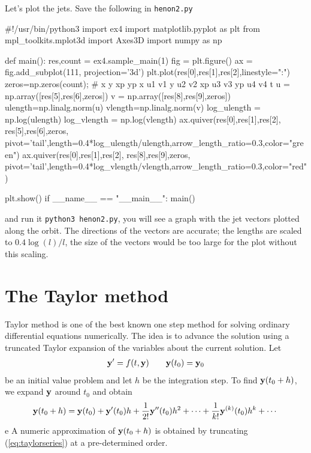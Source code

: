 \documentclass[10pt]{article}
\theoremstyle{remark}
\begin{document}
\vspace{4mm} 
Let's plot the jets. Save the following in \verb+henon2.py+
{
\footnotesize{
\begin{code}[title={File {\tt henon2.py}}]
#!/usr/bin/python3
import ex4
import matplotlib.pyplot as plt
from mpl_toolkits.mplot3d import Axes3D
import numpy as np

def main():
    res,count = ex4.sample_main(1)
    fig = plt.figure()
    ax = fig.add_subplot(111, projection='3d')
    plt.plot(res[0],res[1],res[2],linestyle=":")
    zeros=np.zeros(count);
    # x y xp yp x u1 v1 y u2 v2 xp u3 v3 yp u4 v4 t
    u = np.array([res[5],res[6],zeros])
    v = np.array([res[8],res[9],zeros])
    ulength=np.linalg.norm(u)
    vlength=np.linalg.norm(v)
    log_ulength = np.log(ulength)
    log_vlength = np.log(vlength)
    ax.quiver(res[0],res[1],res[2], res[5],res[6],zeros,
    pivot='tail',length=0.4*log_ulength/ulength,arrow_length_ratio=0.3,color="green")
    ax.quiver(res[0],res[1],res[2], res[8],res[9],zeros,
    pivot='tail',length=0.4*log_vlength/vlength,arrow_length_ratio=0.3,color="red")
  
    plt.show()
if __name__ == "__main__":
   main()
\end{code}
}}

and run it \verb+python3 henon2.py+, you will see a graph with the jet
vectors plotted along the orbit. The directions of the vectors are
accurate; the lengths are scaled to $0.4\log(l)/l$, the size of the
vectors would be too large for the plot without this scaling.





\appendix

\section{The Taylor method}
Taylor method is one of the best known one step method for solving
ordinary differential equations numerically. The idea is to advance
the solution using a truncated Taylor expansion of the variables about
the current solution.  Let
\begin{eqnarray}
\label{eq:ivp}
{\bf y}' = f(t, {\bf y})\qquad {\bf y}(t_0) = {\bf y}_0
\end{eqnarray}
be an initial value problem and let $h$ be the integration step. To
find ${\bf y}(t_0+h)$, we expand ${\bf y}$ around $t_0$ and obtain
\begin{equation}
\label{eq:taylorseries}
{\bf y}(t_0 +h) = {\bf y}(t_0) + {\bf y}'(t_0) h + {1\over
{2!}} {\bf y}''(t_0) h^2 + \cdots + {1 \over {k!}}{\bf
y}^{(k)}(t_0) h^k + \cdots
\end{equation}e
A numeric approximation of ${\bf y}(t_0+h)$ is obtained by truncating
(\ref{eq:taylorseries}) at a pre-determined order.
\end{document}
